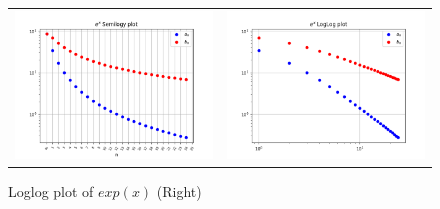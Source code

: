 \documentclass[11pt, a4paper]{article}
\begin{document}
            \begin{figure}[H]
                    \centering
                    \setlength\tabcolsep{2pt}
                    \begin{tabular}{cc}
                       \includegraphics[scale=0.5]{Figure 3.png} &
                       \includegraphics[scale=0.5]{Figure 4.png}
                    \end{tabular}
                    \caption{Semilog Plot of $exp(x)$ (Left)} \caption{Loglog plot of $exp(x)$ (Right)}
                \end{figure}
                
\end{document}
